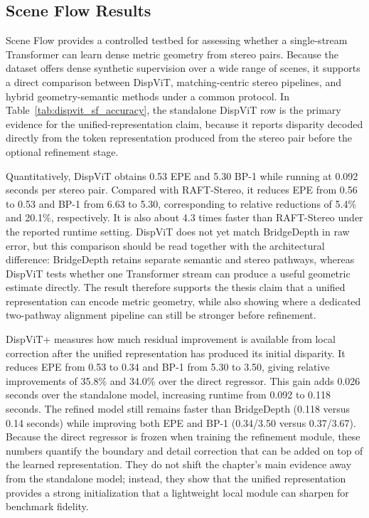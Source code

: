 \subsection{Scene Flow Results}
Scene Flow provides a controlled testbed for assessing whether a single-stream Transformer can learn dense metric geometry from stereo pairs.
Because the dataset offers dense synthetic supervision over a wide range of scenes, it supports a direct comparison between DispViT, matching-centric stereo pipelines, and hybrid geometry-semantic methods under a common protocol.
In Table~\ref{tab:dispvit_sf_accuracy}, the standalone DispViT row is the primary evidence for the unified-representation claim, because it reports disparity decoded directly from the token representation produced from the stereo pair before the optional refinement stage.

Quantitatively, DispViT obtains 0.53 EPE and 5.30 BP-1 while running at 0.092 seconds per stereo pair.
Compared with RAFT-Stereo, it reduces EPE from 0.56 to 0.53 and BP-1 from 6.63 to 5.30, corresponding to relative reductions of 5.4\% and 20.1\%, respectively.
It is also about 4.3 times faster than RAFT-Stereo under the reported runtime setting.
DispViT does not yet match BridgeDepth in raw error, but this comparison should be read together with the architectural difference: BridgeDepth retains separate semantic and stereo pathways, whereas DispViT tests whether one Transformer stream can produce a useful geometric estimate directly.
The result therefore supports the thesis claim that a unified representation can encode metric geometry, while also showing where a dedicated two-pathway alignment pipeline can still be stronger before refinement.

DispViT+ measures how much residual improvement is available from local correction after the unified representation has produced its initial disparity.
It reduces EPE from 0.53 to 0.34 and BP-1 from 5.30 to 3.50, giving relative improvements of 35.8\% and 34.0\% over the direct regressor.
This gain adds 0.026 seconds over the standalone model, increasing runtime from 0.092 to 0.118 seconds.
The refined model still remains faster than BridgeDepth (0.118 versus 0.14 seconds) while improving both EPE and BP-1 (0.34/3.50 versus 0.37/3.67).
Because the direct regressor is frozen when training the refinement module, these numbers quantify the boundary and detail correction that can be added on top of the learned representation.
They do not shift the chapter's main evidence away from the standalone model; instead, they show that the unified representation provides a strong initialization that a lightweight local module can sharpen for benchmark fidelity.

